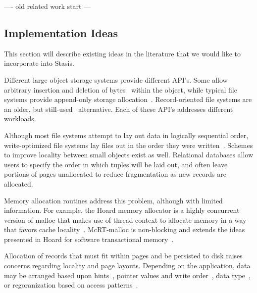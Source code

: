 \documentclass[letterpaper,twocolumn,10pt]{article}
\newcommand{\yad}{Stasis\xspace}
\newcommand{\rcs}[1]{\textcolor{green}{\bf RCS: #1}}
\begin{document}
---- old related work start ---
\subsection{Implementation Ideas}


This section
will describe existing ideas in the literature that we would like to
incorporate into \yad. 


Different large object storage systems provide different API's.
Some allow arbitrary insertion and deletion of bytes~\cite{esm}
within the object, while typical file systems
provide append-only storage allocation~\cite{ffs}.
Record-oriented file systems are an older, but still-used~\cite{gfs}
alternative. Each of these API's addresses 
different workloads.

Although most file systems attempt to lay out data in logically sequential
order, write-optimized file systems lay files out in the order they
were written~\cite{lfs}.  Schemes to improve locality between small
objects exist as well. Relational databases allow users to specify the order
in which tuples will be laid out, and often leave portions of pages
unallocated to reduce fragmentation as new records are allocated.

Memory allocation routines address this problem, although with limited
information.  For example, the Hoard memory allocator is a highly
concurrent version of malloc that makes use of thread context to
allocate memory in a way that favors cache locality~\cite{hoard}.
McRT-malloc is non-blocking and extends the ideas
presented in Hoard for software transactional memory~\cite{mcrt}.

Allocation of records that must fit within pages and be persisted to
disk raises concerns regarding locality and page layouts.  Depending
on the application, data may be arranged based upon
hints~\cite{cricket}, pointer values and write order~\cite{starburst},
data type~\cite{orion}, or regoranization based on access
patterns~\cite{storageReorganization}.

\end{document}
